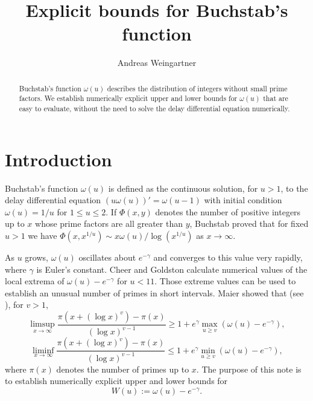 \documentclass[11pt]{amsart}
\begin{document}
\title{Explicit bounds for Buchstab's function}



\author{Andreas Weingartner} 
\address{Department of Mathematics, Southern Utah University, 351 West University Boulevard, Cedar City, Utah 84720, USA} 

\begin{abstract}
Buchstab's function $\omega(u)$ describes the distribution of integers without small prime factors.
We establish numerically explicit upper and lower bounds for $\omega(u)$ that are easy to evaluate,
without the need to solve the delay differential equation numerically.
\end{abstract}

\maketitle

\section{Introduction}
Buchstab's function $\omega(u)$ is defined as the continuous solution, for $u>1$, to the delay differential equation
$(u \omega(u))'=\omega(u-1)$ with initial condition $\omega(u)=1/u$ for $1\le u\le 2$. 
If $\Phi(x,y)$ denotes the number of positive integers up to $x$ whose prime factors are all greater than $y$,
Buchstab \cite{Buch} proved that for fixed $u>1$ we have $\Phi(x,x^{1/u}) \sim x \omega(u)/\log (x^{1/u})$ as $x\to \infty$. 

As $u$ grows,  $\omega(u)$ oscillates about $e^{-\gamma}$ and converges to this value very rapidly, 
where $\gamma$ is Euler's constant.
Cheer and Goldston \cite{CG} calculate numerical values of the local extrema of $\omega(u)-e^{-\gamma}$ for $u<11$.
Those extreme values can be used to establish an unusual number of primes in short intervals.
Maier \cite{Maier} showed that (see \cite[(6)]{CG}), for $v>1$,
$$
\limsup_{x\to \infty} \frac{\pi(x+(\log x)^v )- \pi(x)}{(\log x)^{v-1}} \ge 1+e^\gamma \max_{u\ge v} (\omega(u)-e^{-\gamma}),
$$
$$
\liminf_{x\to \infty} \frac{\pi(x+(\log x)^v )- \pi(x)}{(\log x)^{v-1}} \le 1+e^\gamma \min_{u\ge v} (\omega(u)-e^{-\gamma}),
$$
where $\pi(x)$ denotes the number of primes up to $x$.
The purpose of this note is to establish numerically explicit upper and lower bounds for
$$
W(u):= \omega(u)-e^{-\gamma}.
$$
\end{document}
